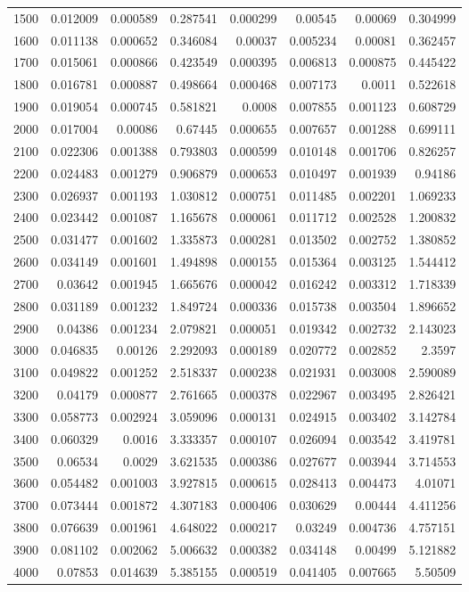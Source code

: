\begin{longtable}{r r r r r r r r}
1500 & 0.012009 & 0.000589 & 0.287541 & 0.000299 & 0.00545 & 0.00069 & 0.304999 \\
1600 & 0.011138 & 0.000652 & 0.346084 & 0.00037 & 0.005234 & 0.00081 & 0.362457 \\
1700 & 0.015061 & 0.000866 & 0.423549 & 0.000395 & 0.006813 & 0.000875 & 0.445422 \\
1800 & 0.016781 & 0.000887 & 0.498664 & 0.000468 & 0.007173 & 0.0011 & 0.522618 \\
1900 & 0.019054 & 0.000745 & 0.581821 & 0.0008 & 0.007855 & 0.001123 & 0.608729 \\
2000 & 0.017004 & 0.00086 & 0.67445 & 0.000655 & 0.007657 & 0.001288 & 0.699111 \\
2100 & 0.022306 & 0.001388 & 0.793803 & 0.000599 & 0.010148 & 0.001706 & 0.826257 \\
2200 & 0.024483 & 0.001279 & 0.906879 & 0.000653 & 0.010497 & 0.001939 & 0.94186 \\
2300 & 0.026937 & 0.001193 & 1.030812 & 0.000751 & 0.011485 & 0.002201 & 1.069233 \\
2400 & 0.023442 & 0.001087 & 1.165678 & 0.000061 & 0.011712 & 0.002528 & 1.200832 \\
2500 & 0.031477 & 0.001602 & 1.335873 & 0.000281 & 0.013502 & 0.002752 & 1.380852 \\
2600 & 0.034149 & 0.001601 & 1.494898 & 0.000155 & 0.015364 & 0.003125 & 1.544412 \\
2700 & 0.03642 & 0.001945 & 1.665676 & 0.000042 & 0.016242 & 0.003312 & 1.718339 \\
2800 & 0.031189 & 0.001232 & 1.849724 & 0.000336 & 0.015738 & 0.003504 & 1.896652 \\
2900 & 0.04386 & 0.001234 & 2.079821 & 0.000051 & 0.019342 & 0.002732 & 2.143023 \\
3000 & 0.046835 & 0.00126 & 2.292093 & 0.000189 & 0.020772 & 0.002852 & 2.3597 \\
3100 & 0.049822 & 0.001252 & 2.518337 & 0.000238 & 0.021931 & 0.003008 & 2.590089 \\
3200 & 0.04179 & 0.000877 & 2.761665 & 0.000378 & 0.022967 & 0.003495 & 2.826421 \\
3300 & 0.058773 & 0.002924 & 3.059096 & 0.000131 & 0.024915 & 0.003402 & 3.142784 \\
3400 & 0.060329 & 0.0016 & 3.333357 & 0.000107 & 0.026094 & 0.003542 & 3.419781 \\
3500 & 0.06534 & 0.0029 & 3.621535 & 0.000386 & 0.027677 & 0.003944 & 3.714553 \\
3600 & 0.054482 & 0.001003 & 3.927815 & 0.000615 & 0.028413 & 0.004473 & 4.01071 \\
3700 & 0.073444 & 0.001872 & 4.307183 & 0.000406 & 0.030629 & 0.00444 & 4.411256 \\
3800 & 0.076639 & 0.001961 & 4.648022 & 0.000217 & 0.03249 & 0.004736 & 4.757151 \\
3900 & 0.081102 & 0.002062 & 5.006632 & 0.000382 & 0.034148 & 0.00499 & 5.121882 \\
4000 & 0.07853 & 0.014639 & 5.385155 & 0.000519 & 0.041405 & 0.007665 & 5.50509 \\
\end{longtable}

